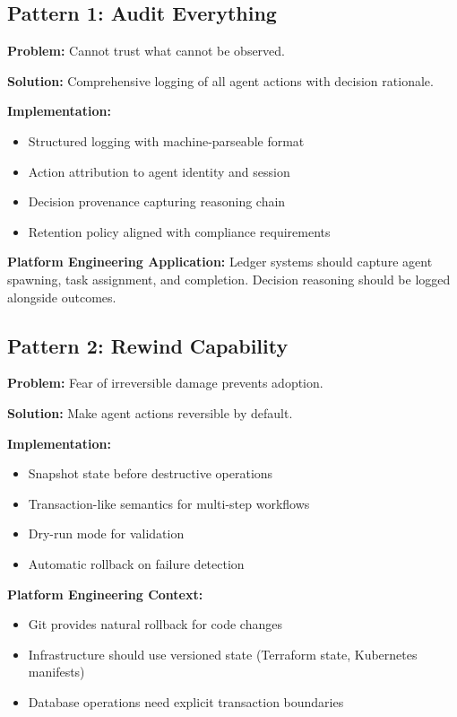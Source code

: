 \subsection{Pattern 1: Audit Everything}
\label{subsec:audit-everything}

\textbf{Problem:} Cannot trust what cannot be observed.

\textbf{Solution:} Comprehensive logging of all agent actions with decision rationale.

\textbf{Implementation:}
\begin{itemize}
    \item Structured logging with machine-parseable format
    \item Action attribution to agent identity and session
    \item Decision provenance capturing reasoning chain
    \item Retention policy aligned with compliance requirements
\end{itemize}

\textbf{Platform Engineering Application:}
Ledger systems should capture agent spawning, task assignment, and completion. Decision reasoning should be logged alongside outcomes.

\subsection{Pattern 2: Rewind Capability}
\label{subsec:rewind-capability}

\textbf{Problem:} Fear of irreversible damage prevents adoption.

\textbf{Solution:} Make agent actions reversible by default.

\textbf{Implementation:}
\begin{itemize}
    \item Snapshot state before destructive operations
    \item Transaction-like semantics for multi-step workflows
    \item Dry-run mode for validation
    \item Automatic rollback on failure detection
\end{itemize}

\textbf{Platform Engineering Context:}
\begin{itemize}
    \item Git provides natural rollback for code changes
    \item Infrastructure should use versioned state (Terraform state, Kubernetes manifests)
    \item Database operations need explicit transaction boundaries
\end{itemize}

